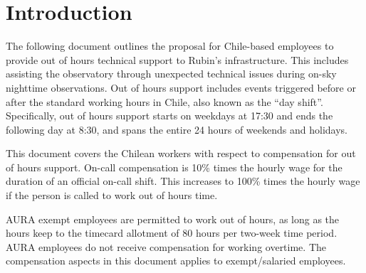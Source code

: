 \section{Introduction}

The following document outlines the proposal for Chile-based employees to provide out of hours technical support to Rubin's infrastructure.
This includes assisting the observatory through unexpected technical issues during on-sky nighttime observations.
Out of hours support includes events triggered before or after the standard working hours in Chile, also known as the ``day shift''.
Specifically, out of hours support starts on weekdays at 17:30 and ends the following day at 8:30, and spans the entire 24 hours of weekends and holidays.

This document covers the Chilean workers with respect to compensation for out of hours support.  
On-call compensation is 10\% times the hourly wage for the duration of an official on-call shift.  This increases to 100\% times the hourly wage if the person is called to work out of hours time.

AURA exempt employees are permitted to work out of hours, as long as the hours keep to the timecard allotment of 80 hours per two-week time period.  AURA employees do not receive compensation for working overtime.
The compensation aspects in this document applies to exempt/salaried employees.
